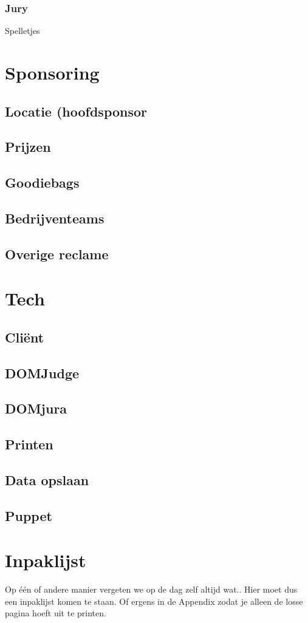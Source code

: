 		\subsubsection{Jury}
		Spelletjes

\section{Sponsoring}
	\subsection{Locatie (hoofdsponsor}
	
	\subsection{Prijzen}
	
	\subsection{Goodiebags}
	
	\subsection{Bedrijventeams}
	
	\subsection{Overige reclame}
	
\section{Tech}
	\subsection{Cli\"ent}
	
	\subsection{DOMJudge}
	
	\subsection{DOMjura}
	
	\subsection{Printen}
	
	\subsection{Data opslaan}
	
	\subsection{Puppet}
	
\section{Inpaklijst}
Op \'e\'en of andere manier vergeten we op de dag zelf altijd wat.. Hier moet dus een inpaklijst komen te staan. Of ergens in de Appendix zodat je alleen de losse pagina hoeft uit te printen.